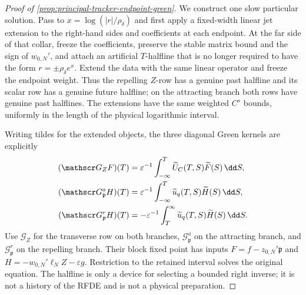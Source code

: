 \begin{proof}[Proof of \cref{prop:principal-tracker-endpoint-green}]
We construct one slow particular solution.  Pass to
\(x=\log(|r|/\rho_\delta)\) and first apply a fixed-width linear jet
extension to the right-hand sides and coefficients at each endpoint.  At
the far side of that collar, freeze the coefficients, preserve the stable
matrix bound and the sign of \(w_{0,N}'\), and attach an artificial
\(T\)-halfline that is no longer required to have the form
\(r=\pm\rho_\delta e^x\).  Extend the data with the same linear operator
and freeze the endpoint weight.  Thus the repelling \(Z\)-row has a genuine
past halfline and its scalar row has a genuine future halfline; on the
attracting branch both rows have genuine past halflines.  The extensions
have the same weighted \(C^s\) bounds, uniformly in the length of the
physical logarithmic interval.

Writing tildes for the extended objects, the three diagonal Green kernels
are explicitly
\begin{align}
 (\mathscr G_ZF)(T)
 &=\varepsilon^{-1}\int_{-\infty}^T
       \widetilde U_C(T,S)\widetilde F(S)\,\dd S,\notag\\
 (\mathscr G_{\mathfrak p}^aH)(T)
 &=\varepsilon^{-1}\int_{-\infty}^T
       \widetilde u_q(T,S)\widetilde H(S)\,\dd S,\notag\\
 (\mathscr G_{\mathfrak p}^rH)(T)
 &=-\varepsilon^{-1}\int_T^\infty
       \widetilde u_q(T,S)\widetilde H(S)\,\dd S.  \label{eq:principal-green-diagonal-kernels}
\end{align}
Use \(\mathscr G_Z\) for the transverse row on both branches,
\(\mathscr G_{\mathfrak p}^a\) on the attracting branch, and
\(\mathscr G_{\mathfrak p}^r\) on the repelling branch.  Their block fixed
point has inputs
\(F=f-z_{0,N}'\mathfrak p\) and
\(H=-w_{0,N}'\ell_NZ-\varepsilon g\).
Restriction to the retained interval solves the original equation.  The
halfline is only a device for selecting a bounded right inverse; it is not a
history of the RFDE and is not a physical preparation.


\end{proof}
